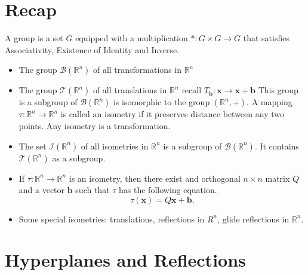 \section{Recap}

A group is a set \( G \) equipped with a multiplication \( * : G \times G \to G \) that
satisfies Associativity, Existence of Identity and Inverse.

\begin{itemize}
  \item The group \( \mathscr{B}(\mathbb{R}^{n}) \) of all transformations in \( \mathbb{R}^{n} \)
  \item The group \( \mathscr{T}(\mathbb{R}^{n}) \) of all translations in \( \mathbb{R}^{n} \)
    recall \( T_{\mathbf{b}}: \mathbf{x} \to \mathbf{x} + \mathbf{b} \)
    This group is a subgroup of \( \mathscr{B}(\mathbb{R}^{n}) \) is isomorphic to the group \((\mathbb{R}^{n}, +)\).
    A mapping \( \tau : \mathbb{R}^{n} \to  \mathbb{R}^{n} \) is called an isometry if it preserves
    distance between any two points. Any isometry is a transformation.

  \item The set \( \mathscr{I}(\mathbb{R}^{n}) \) of all isometries in \( \mathbb{R}^{n} \) is a subgroup of \( \mathscr{B}(\mathbb{R}^{n}) \). It contains \( \mathscr{T}(\mathbb{R}^{n}) \)
    as a subgroup.
  \item If \( \tau : \mathbb{R}^{n} \to  \mathbb{R}^{n} \) is an isometry, then there exist and orthogonal \( n \times n \) matrix
    \( Q \) and a vector \( \mathbf{b} \) such that \( \tau  \) has the following equation.
    \[
      \tau (\mathbf{x}) = Q \mathbf{x} + \mathbf{b}
    .\] 
  \item Some special isometries: translations, reflections in \( R^{n} \), glide reflections in \( \mathbb{R}^{n} \).
\end{itemize}

\section{Hyperplanes and Reflections}

